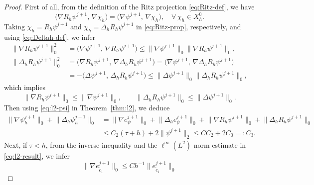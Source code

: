 \begin{proof}
First of all, from the definition of the Ritz projection \eqref{eq:Ritz-def}, we have
\begin{equation}\label{eq:Ritz-prop}
  \bigl(\nabla R_{h}\psi^{j+1},\, \nabla\chi_{h}\bigr)
  = \bigl(\nabla\psi^{j+1},\, \nabla\chi_{h}\bigr), \quad \forall\,\chi_{h}\in X_{h}^{0}.
\end{equation}
Taking $\chi_{h} = R_{h}\psi^{j+1}$ and $\chi_{h} = \Delta_{h}R_{h}\psi^{j+1}$ in
\eqref{eq:Ritz-prop}, respectively, and using \eqref{eq:Deltah-def}, we infer
\begin{align}
  \bigl\|\nabla R_{h}\psi^{j+1}\bigr\|_{0}^{2}
  &= \bigl(\nabla\psi^{j+1},\, \nabla R_{h}\psi^{j+1}\bigr)
   \leq \bigl\|\nabla\psi^{j+1}\bigr\|_{0}\bigl\|\nabla R_{h}\psi^{j+1}\bigr\|_{0},
  \label{eq:Ritz-grad}\\[4pt]
  \bigl\|\Delta_{h}R_{h}\psi^{j+1}\bigr\|_{0}^{2}
  &= \bigl(\nabla R_{h}\psi^{j+1},\, \nabla\Delta_{h}R_{h}\psi^{j+1}\bigr)
   = \bigl(\nabla\psi^{j+1},\, \nabla\Delta_{h}R_{h}\psi^{j+1}\bigr)
  \nonumber\\
  &= -\bigl(\Delta\psi^{j+1},\, \Delta_{h}R_{h}\psi^{j+1}\bigr)
   \leq \bigl\|\Delta\psi^{j+1}\bigr\|_{0}\bigl\|\Delta_{h}R_{h}\psi^{j+1}\bigr\|_{0},
  \label{eq:Ritz-Deltah}
\end{align}
which implies
\begin{equation}\label{eq:Ritz-bound}
  \bigl\|\nabla R_{h}\psi^{j+1}\bigr\|_{0} \leq \bigl\|\nabla\psi^{j+1}\bigr\|_{0}, \qquad
  \bigl\|\Delta_{h}R_{h}\psi^{j+1}\bigr\|_{0} \leq \bigl\|\Delta\psi^{j+1}\bigr\|_{0}.
\end{equation}
Then using \eqref{eq:l2-psi} in Theorem~\ref{thm:l2}, we deduce
\begin{align}
  \bigl\|\nabla\psi_{h}^{j+1}\bigr\|_{0}
  + \bigl\|\Delta_{h}\psi_{h}^{j+1}\bigr\|_{0}
  &= \bigl\|\nabla e_{\psi}^{j+1}\bigr\|_{0}
   + \bigl\|\Delta_{h}e_{\psi}^{j+1}\bigr\|_{0}
   + \bigl\|\nabla R_{h}\psi^{j+1}\bigr\|_{0}
   + \bigl\|\Delta_{h}R_{h}\psi^{j+1}\bigr\|_{0}
  \nonumber\\
  &\leq C_{2}(\tau+h) + 2\bigl\|\psi^{j+1}\bigr\|_{2}
   \leq CC_{2} + 2C_{0} =: C_{3}.
  \label{eq:stab-psi-proof}
\end{align}
Next, if $\tau < h$, from the inverse inequality and the $\ell^{\infty}(L^{2})$ norm estimate
in \eqref{eq:l2-result}, we infer
\begin{equation}\label{eq:grad-ec1-case1}
  \bigl\|\nabla e_{\tilde{c}_{1}}^{j+1}\bigr\|_{0}
  \leq Ch^{-1}\bigl\|e_{\tilde{c}_{1}}^{j+1}\bigr\|_{0}

\end{equation}
\end{proof}
